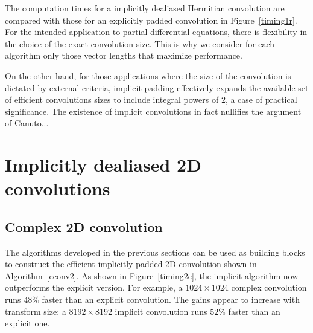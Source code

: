 \documentclass[final]{siamltex}
\def\be{\begin{dmath*}}
\def\ee{\end{dmath*}}
\def\bel{\begin{dmath}}
\def\eel{\end{dmath}}
\def\no{\hiderel}
\begin{document}

The computation times for a implicitly dealiased Hermitian
convolution are compared with those for an explicitly padded convolution in
Figure~\ref{timing1r}. For the intended application to partial differential
equations, there is flexibility in the choice of the exact convolution
size. This is why we consider for each algorithm only those vector lengths
that maximize performance.

On the other hand, for those applications where the size of the convolution
is dictated by external criteria, implicit padding effectively expands the
available set of efficient convolutions sizes to include integral powers of
$2$, a case of practical significance. The existence of implicit convolutions in
fact nullifies the argument of Canuto...

\section{Implicitly dealiased 2D convolutions}\label{2d}

\subsection{Complex 2D convolution}
The algorithms developed in the previous sections can be used as building
blocks to construct the efficient implicitly padded 2D convolution shown in
Algorithm~\ref{cconv2}. As shown in Figure~\ref{timing2c}, the implicit
algorithm now outperforms the explicit version. 
For example, a $1024\times 1024$ complex convolution runs $48\%$ faster
than an explicit convolution. The gains appear to increase with transform
size: a $8192\times 8192$ implicit convolution runs $52\%$ faster than an
explicit one.
\end{document}
